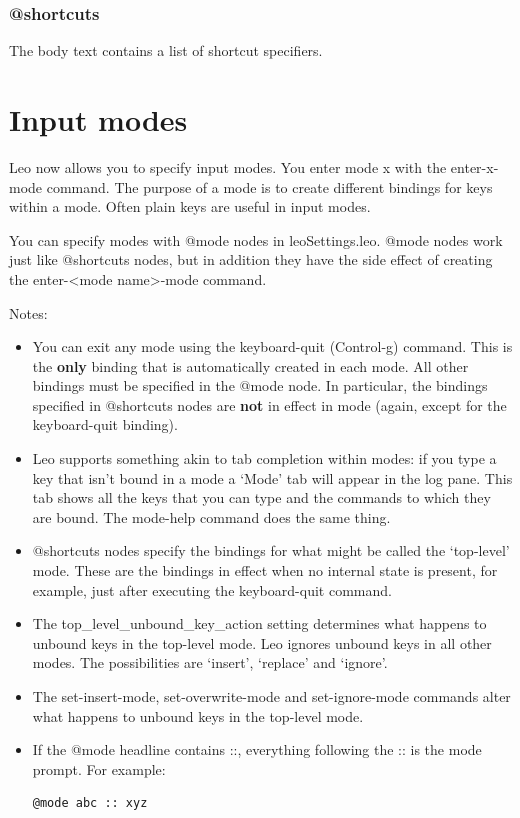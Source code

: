 \documentclass[a4paper,10pt,english]{sphinxmanual}
\begin{document}
\subsubsection{@shortcuts}
\label{customizing:shortcuts}
The body text contains a list of shortcut specifiers.


\section{Input modes}
\label{customizing:input-modes}
Leo now allows you to specify input modes. You enter mode x with the
enter-x-mode command. The purpose of a mode is to create different bindings
for keys within a mode. Often plain keys are useful in input modes.

You can specify modes with @mode nodes in leoSettings.leo. @mode nodes work
just like @shortcuts nodes, but in addition they have the side effect of
creating the enter-\textless{}mode name\textgreater{}-mode command.

Notes:
\begin{itemize}
\item {} 
You can exit any mode using the keyboard-quit (Control-g) command. This is the
\textbf{only} binding that is automatically created in each mode. All other bindings
must be specified in the @mode node. In particular, the bindings specified in
@shortcuts nodes are \textbf{not} in effect in mode (again, except for the
keyboard-quit binding).

\item {} 
Leo supports something akin to tab completion within modes: if you type a key
that isn't bound in a mode a `Mode' tab will appear in the log pane. This tab
shows all the keys that you can type and the commands to which they are bound.
The mode-help command does the same thing.

\item {} 
@shortcuts nodes specify the bindings for what might be called the `top-level'
mode. These are the bindings in effect when no internal state is present, for
example, just after executing the keyboard-quit command.

\item {} 
The top\_level\_unbound\_key\_action setting determines what happens to
unbound keys in the top-level mode. Leo ignores unbound keys in all other modes.
The possibilities are `insert', `replace' and `ignore'.

\item {} 
The set-insert-mode, set-overwrite-mode and set-ignore-mode
commands alter what happens to unbound keys in the top-level mode.

\item {} 
If the @mode headline contains ::, everything following
the :: is the mode prompt. For example:

\begin{Verbatim}[commandchars=\\\{\}]
@mode abc :: xyz
\end{Verbatim}

\end{itemize}
\end{document}
